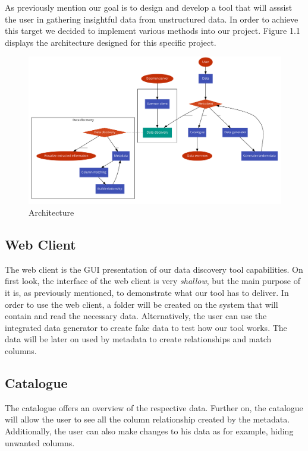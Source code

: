 As previously mention our goal is to design and develop a tool that will asssist the user in gathering insightful data from unstructured data.
In order to achieve this target we decided to implement various methods into our project. Figure 1.1 displays the architecture designed for this specific project.  
\begin {figure} [h]
    \centering
    \includegraphics[width=16cm]{figures/architecture.pdf}
    \caption {Architecture}
    \label {fig:architecture_diagram}
\end{figure}
\vspace{5mm} %
\subsection{Web Client}
The web client is the GUI presentation of our data discovery tool capabilities. On first look, the interface of the web client is very \emph{shallow}, but the main purpose of it is, as previously mentioned, to demonstrate what our tool has to deliver. In order to use the web client, a folder will be created on the system that will contain and read the necessary data. Alternatively, the user can use the integrated data generator to create fake data to test how our tool works. The data will be later on used by metadata to create relationships and match columns.
\vspace{5mm} %
\subsection{Catalogue}
The catalogue offers an overview of the respective data. Further on, the catalogue will allow the user to see all the column relationship created by the metadata. Additionally, the user can also make changes to his data as for example, hiding unwanted columns.
\vspace{5mm} %
